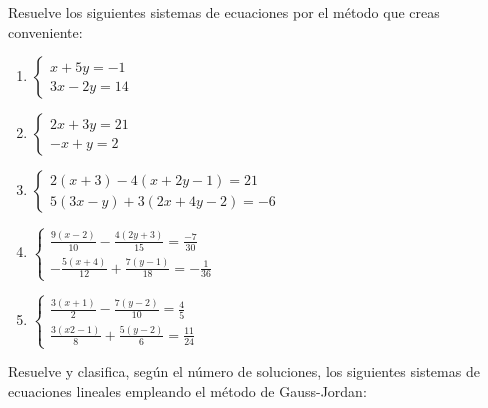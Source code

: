 \Exercicio Resuelve los siguientes sistemas de ecuaciones por el método que creas conveniente:

\begin{enumerate}[topsep=0pt]
	\item $\begin{cases}
			x+5y = -1 \\
			3x-2y = 14
			\end{cases}$
	\item $\begin{cases}
			2x+3y = 21 \\
			-x + y = 2
			\end{cases}$
	\item $\begin{cases}
			2(x+3) - 4(x+2y-1) = 21 \\
			5(3x-y) + 3(2x+4y-2) = -6
		   \end{cases}$
	\item $\begin{cases}
			\frac{9(x-2)}{10} - \frac{4(2y + 3)}{15} = \frac{-7}{30} \\
			-\frac{5(x+4)}{12} + \frac{7(y-1)}{18} = -\frac{1}{36}
		   \end{cases} $
	\item $\begin{cases}
			\frac{3(x+1)}{2} - \frac{7(y-2)}{10} = \frac{4}{5} \\
			\frac{3(x2-1)}{8} + \frac{5(y-2)}{6} = \frac{11}{24}
		   \end{cases}$
\end{enumerate}


\Exercicio Resuelve y clasifica, según el número de soluciones, los siguientes sistemas de ecuaciones lineales empleando el método de Gauss-Jordan:


